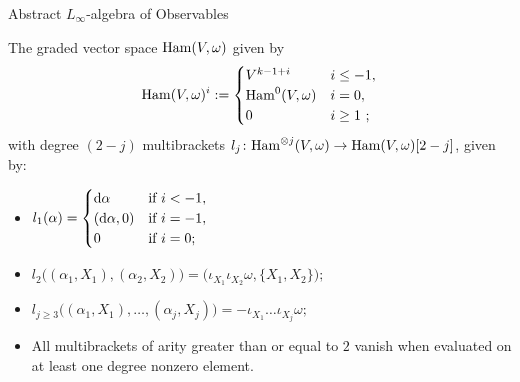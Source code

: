 \documentclass[beamer,10pt]{standalone}
\begin{document}
\begin{frame}{Abstract {$L_\infty$}-algebra of Observables}


\begin{defblock}
  The graded vector space $\mathrm{Ham}(V, \omega)$  given by
  $$
  \mathrm{Ham}(V, \omega)^i := \begin{cases}
    V^{k-1 + i} & i \leq -1, \\
    \mathrm{Ham}^0(V, \omega) & i = 0,\\
    0 & i \geq 1~;
  \end{cases} 
  $$
  with degree $(2-j)$ multibrackets $l_j\colon \mathrm{Ham}^{\otimes j}(V, \omega) \to \mathrm{Ham}(V, \omega)[2-j]$, given by:

	\begin{itemize}[label=$\cdot$]
		\item $
			      l_1(\alpha) = \begin{cases}
				      \mathop{}\!\mathrm{d}\alpha      & \text{if } i < -1, \\
				      (\mathop{}\!\mathrm{d}\alpha, 0) & \text{if } i = -1, \\
				      0             & \text{if } i = 0;
			      \end{cases} $\\
		\item $
        l_2\big( (\alpha_1, X_1), (\alpha_2, X_2) \big) = \big( \iota_{X_1} \iota_{X_2} \omega, \{X_1, X_2\} \big);
		      $\\
		\item $
          l_{j\geq 3}\big( (\alpha_1, X_1), \dots, (\alpha_j, X_j) \big) = -\iota_{X_1} \dots \iota_{X_j} \omega;
		      $\\
		\item All multibrackets of arity greater than or equal to $2$ vanish when evaluated on at least one degree nonzero element.
	\end{itemize}
\end{defblock}
%


\end{frame}
\end{document}
